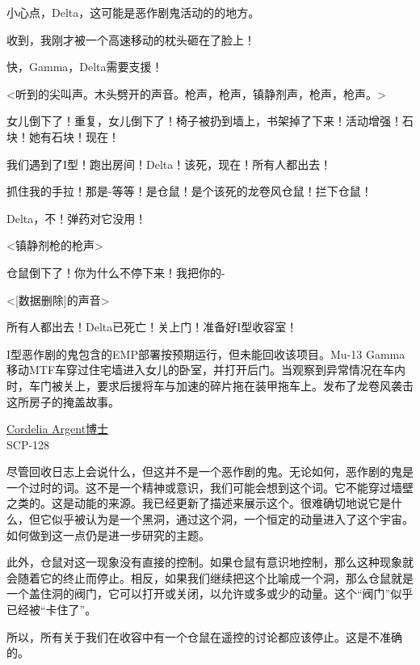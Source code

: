 \begin{scpbox}
小心点，Delta，这可能是恶作剧鬼活动的的地方。

收到，我刚才被一个高速移动的枕头砸在了脸上！

快，Gamma，Delta需要支援！

<听到的尖叫声。木头劈开的声音。枪声，枪声，镇静剂声，枪声，枪声。>

女儿倒下了！重复，女儿倒下了！椅子被扔到墙上，书架掉了下来！活动增强！石块！她有石块！现在！

我们遇到了I型！跑出房间！Delta！该死，现在！所有人都出去！

抓住我的手拉！那是-等等！是仓鼠！是个该死的龙卷风仓鼠！拦下仓鼠！

Delta，不！弹药对它没用！

<镇静剂枪的枪声>

仓鼠倒下了！你为什么不停下来！我把你的-

<{[}数据删除]的声音>

所有人都出去！Delta已死亡！关上门！准备好I型收容室！


I型恶作剧的鬼包含的EMP部署按预期运行，但未能回收该项目。Mu-13 Gamma 移动MTF车穿过住宅墙进入女儿的卧室，并打开后门。当观察到异常情况在车内时，车门被关上，要求后援将车与加速的碎片拖在装甲拖车上。发布了龙卷风袭击这所房子的掩盖故事。

\end{scpbox}


\begin{scpbox}

\hyperref[chap:SCP-2460]{Cordelia Argent}\hyperref[chap:SCP-3966]{博士}\\
SCP-128

尽管回收日志上会说什么，但这并不是一个恶作剧的鬼。无论如何，恶作剧的鬼是一个过时的词。这不是一个精神或意识，我们可能会想到这个词。它不能穿过墙壁之类的。这是动能的来源。我已经更新了描述来展示这个。很难确切地说它是什么，但它似乎被认为是一个黑洞，通过这个洞，一个恒定的动量进入了这个宇宙。如何做到这一点仍是进一步研究的主题。

此外，仓鼠对这一现象没有直接的控制。如果仓鼠有意识地控制，那么这种现象就会随着它的终止而停止。相反，如果我们继续把这个比喻成一个洞，那么仓鼠就是一个盖住洞的阀门，它可以打开或关闭，以允许或多或少的动量。这个“阀门”似乎已经被“卡住了”。

所以，所有关于我们在收容中有一个仓鼠在遥控的讨论都应该停止。这是不准确的。

\end{scpbox}

